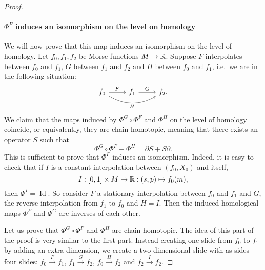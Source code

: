 \begin{proof}
\paragraph{$\Phi^{F}$ induces an isomorphism on the level on homology}

We will now prove that this map induces an isomorphism on the level of homology.
Let $f_0, f_1, f_2$ be Morse functions $M \to  \mathbb{R}$.
Suppose $F$ interpolates between $f_0$ and $f_1$,
$G$ between $f_1$ and $f_2$ and $H$ between $f_0$ and $f_1$, i.e.\ we are in the following situation:
\[
    \begin{tikzcd}
        f_0 \arrow[rr, "H"', bend right] \arrow[r, "F"] &f_1 \arrow[r, "G"] &f_2.
    \end{tikzcd}
\]
We claim that the maps induced by $\Phi^{G} \circ \Phi^{F}$ and $\Phi^{H}$ on the level of homology coincide, or equivalently, they are chain homotopic, meaning that there exists an operator $S$ such that
 \[
\Phi^{G}  \circ  \Phi^{F} - \Phi^{H} = \partial S + S \partial
.\] 
This is sufficient to prove that $\Phi^{F}$ induces an isomorphism.
Indeed, it is easy to check that if $I$ is a constant interpolation between  $(f_0, X_0)$ and itself, 
\[
    I: [0,1] \times M \to  \mathbb{R}: (s, p) \mapsto f_0(m),
\] 
then $\Phi^{I} = \operatorname{Id}$.
So consider $F$ a stationary interpolation between $f_0$ and $f_1$ and $G$, the reverse interpolation from $f_1$ to $f_0$ and $H = I$. Then the induced homological maps $\Phi^{F}$ and $\Phi^{G}$ are inverses of each other.

Let us prove that $\Phi^{G}  \circ  \Phi^{F}$ and $\Phi^{H}$ are chain homotopic.
The idea of this part of the proof is very similar to the first part.
Instead creating one slide from $f_0$ to $f_1$ by adding an extra dimension, we create a two dimensional slide with as sides four slides: $f_0 \xrightarrow{F} f_1$, $ f_1 \xrightarrow{G} f_2$, $f_0 \xrightarrow{H}  f_2$ and $ f_2 \xrightarrow{I} f_2$.



\end{proof}
